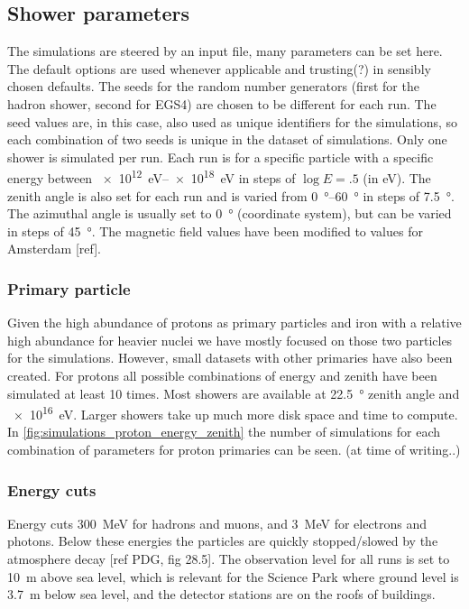 \subsection{Shower parameters}

The simulations are steered by an input file, many parameters can be set
here. The default options are used whenever applicable and trusting(?)
in sensibly chosen defaults. The seeds for the random number generators
(first for the hadron shower, second for EGS4) are chosen to be
different for each run. The seed values are, in this case, also used as
unique identifiers for the simulations, so each combination of two seeds
is unique in the dataset of simulations. Only one shower is simulated
per run. Each run is for a specific particle with a specific energy
between \SIrange{e12}{e18}{\electronvolt} in steps of $\log E = .5$
(in eV). The zenith angle is also set for each run and is varied from
\SIrange{0}{60}{\degree} in steps of \SI{7.5}{\degree}. The azimuthal
angle is usually set to \SI{0}{\degree} (\hisparc coordinate system),
but can be varied in steps of \SI{45}{\degree}. The magnetic field
values have been modified to values for Amsterdam [ref].


\subsubsection{Primary particle}

Given the high abundance of protons as primary particles and iron with a
relative high abundance for heavier nuclei we have mostly focused on
those two particles for the simulations. However, small datasets with
other primaries have also been created. For protons all possible
combinations of energy and zenith have been simulated at least 10 times.
Most showers are available at \SI{22.5}{\degree} zenith angle and
\SI{e16}{\electronvolt}. Larger showers take up much more disk space and
time to compute. In \ref{fig:simulations_proton_energy_zenith} the
number of simulations for each combination of parameters for proton
primaries can be seen. (at time of writing..)


\subsubsection{Energy cuts}

Energy cuts \SI{300}{\mega\electronvolt} for hadrons and muons, and
\SI{3}{\mega\electronvolt} for electrons and photons. Below these
energies the particles are quickly stopped/slowed by the atmosphere
decay [ref PDG, fig 28.5]. The observation level for all runs is set to
\SI{10}{\meter} above sea level, which is relevant for the Science Park
where ground level is \SI{3.7}{\meter} below sea level, and the detector
stations are on the roofs of buildings.


